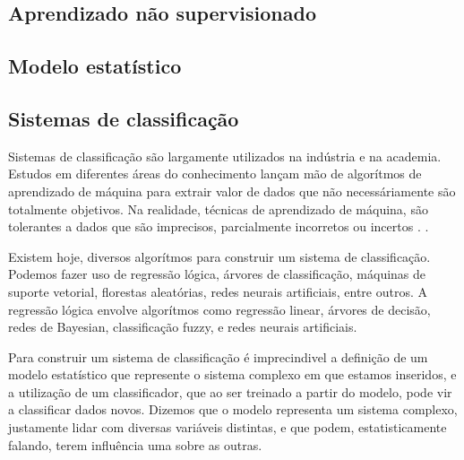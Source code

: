\subsection{Aprendizado não supervisionado}

\subsection{Modelo estatístico}

\subsection{Sistemas de classificação}
Sistemas de classificação são largamente utilizados na indústria e na academia. Estudos em diferentes áreas do conhecimento
lançam mão de algorítmos de aprendizado de máquina para extrair valor de dados que não necessáriamente são totalmente objetivos. Na realidade,
técnicas de aprendizado de máquina, são tolerantes a dados que são imprecisos, parcialmente incorretos ou incertos \cite{Malhotra}. .

Existem hoje, diversos algorítmos para construir um sistema de classificação. Podemos fazer uso de regressão lógica, árvores de classificação, máquinas de suporte vetorial, florestas aleatórias, redes neurais artificiais, entre outros.
A regressão lógica envolve algorítmos como regressão linear, árvores de decisão, redes de Bayesian, classificação fuzzy, e redes neurais artificiais\cite{Louridas}.


Para construir um sistema de classificação é imprecindivel a definição de um modelo estatístico que represente o sistema complexo em que estamos inseridos, e a utilização de um classificador, que ao ser treinado a partir do modelo, pode vir a classificar dados novos. Dizemos que o modelo representa um sistema complexo, justamente lidar com diversas variáveis distintas, e que podem, estatisticamente falando, terem influência uma sobre as outras.
